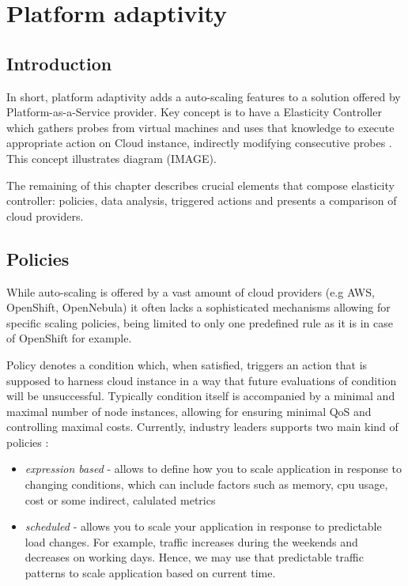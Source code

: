 \chapter{Platform adaptivity}


\section{Introduction}
In short, platform adaptivity adds a auto-scaling features to a solution offered by Platform-as-a-Service provider. Key concept is to have a Elasticity Controller which gathers probes from virtual machines and uses that knowledge to execute appropriate action on Cloud instance, indirectly modifying consecutive probes \cite{VaRoBu11}. This concept illustrates diagram (IMAGE).



The remaining of this chapter describes crucial elements that compose elasticity controller: policies, data analysis, triggered actions and presents a comparison of cloud providers.
 
\section{Policies}
While auto-scaling is offered by a vast amount of cloud providers (e.g AWS, OpenShift, OpenNebula) it often lacks a sophisticated mechanisms allowing for specific scaling policies, being limited to only one predefined rule as it is in case of OpenShift for example. 
 
Policy denotes a condition which, when satisfied, triggers an action that is supposed to harness cloud instance in a way that future evaluations of condition will be unsuccessful. Typically condition itself is accompanied by a minimal and maximal number of node instances, allowing for ensuring minimal QoS and controlling maximal costs. Currently, industry leaders supports two main kind of policies \cite{AmazonAutoScaling}:
\begin{itemize}
 \item \textit{expression based} - allows to define how you to scale application in response to changing conditions, which can include factors such as memory, cpu usage, cost or some indirect, calulated metrics
 \item \textit{scheduled} - allows you to scale your application in response to predictable load changes. For example, traffic increases during the weekends and decreases on working days. Hence, we may use that predictable traffic patterns to scale application based on current time.
\end{itemize}

